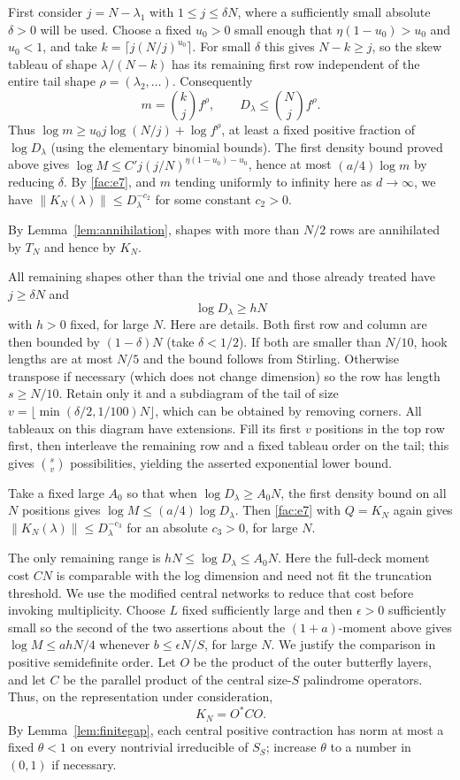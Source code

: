 First consider $j=N-\lambda_1$ with $1\le j\le\delta N$, where a sufficiently small absolute $\delta>0$ will be used. Choose a fixed $u_0>0$ small enough that $\eta(1-u_0)>u_0$ and $u_0<1$, and take $k=\lceil j(N/j)^{u_0}\rceil$. For small $\delta$ this gives $N-k\ge j$, so the skew tableau of shape $\lambda/(N-k)$ has its remaining first row independent of the entire tail shape $\rho=(\lambda_2,\ldots)$. Consequently
\[
m=\binom{k}{j} f^\rho,\qquad D_\lambda\le \binom Nj f^\rho.
\]
Thus $\log m\ge u_0 j\log(N/j)+\log f^\rho$, at least a fixed positive fraction of $\log D_\lambda$ (using the elementary binomial bounds). The first density bound proved above gives $\log M\le C' j(j/N)^{\eta(1-u_0)-u_0}$, hence at most $(a/4)\log m$ by reducing $\delta$. By \eqref{fac:e7}, and $m$ tending uniformly to infinity here as $d\to\infty$, we have $\|K_N(\lambda)\|\le D_\lambda^{-c_2}$ for some constant $c_2>0$.

By Lemma~\ref{lem:annihilation}, shapes with more than $N/2$ rows
are annihilated by $T_N$ and hence by $K_N$.

All remaining shapes other than the trivial one and those already treated have $j\ge\delta N$ and
\[
\log D_\lambda\ge hN
\]
with $h>0$ fixed, for large $N$. Here are details. Both first row and column are then bounded by $(1-\delta)N$ (take $\delta<1/2$). If both are smaller than $N/10$, hook lengths are at most $N/5$ and the bound follows from Stirling. Otherwise transpose if necessary (which does not change dimension) so the row has length $s\ge N/10$. Retain only it and a subdiagram of the tail of size $v=\lfloor\min(\delta/2,1/100)N\rfloor$, which can be obtained by removing corners. All tableaux on this diagram have extensions. Fill its first $v$ positions in the top row first, then interleave the remaining row and a fixed tableau order on the tail; this gives $\binom{s}{v}$ possibilities, yielding the asserted exponential lower bound.

Take a fixed large $A_0$ so that when $\log D_\lambda\ge A_0 N$, the first density bound on all $N$ positions gives $\log M\le(a/4)\log D_\lambda$. Then \eqref{fac:e7} with $Q=K_N$ again gives $\|K_N(\lambda)\|\le D_\lambda^{-c_3}$ for an absolute $c_3>0$, for large $N$.

The only remaining range is $hN\le\log D_\lambda\le A_0 N$. Here the full-deck moment cost $CN$ is comparable with the log dimension and need not fit the truncation threshold. We use the modified central networks to reduce that cost before invoking multiplicity. Choose $L$ fixed sufficiently large and then $\epsilon>0$ sufficiently small so the second of the two assertions about the $(1+a)$-moment above gives $\log M\le ahN/4$ whenever $b\le\epsilon N/S$, for large $N$. We justify the comparison in positive semidefinite order. Let $O$ be
the product of the outer butterfly layers, and let $C$ be the parallel
product of the central size-$S$ palindrome operators. Thus, on the
representation under consideration,
\[
 K_N=O^*CO.
\]
By Lemma~\ref{lem:finitegap}, each central positive contraction has norm
at most a fixed $\theta<1$ on every nontrivial irreducible of $S_S$;
increase $\theta$ to a number in $(0,1)$ if necessary.


